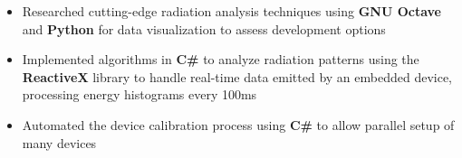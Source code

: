 \documentclass{moderncv}
\begin{document}
{\begin{itemize}
    \item Researched cutting-edge radiation analysis techniques using \textbf{GNU Octave} and \textbf{Python} for data visualization to assess development options
    \item Implemented algorithms in \textbf{C\#} to analyze radiation patterns using the \textbf{ReactiveX} library to handle real-time data emitted by an embedded device, processing energy histograms every 100ms
    \item Automated the device calibration process using \textbf{C\#} to allow parallel setup of many devices
\end{itemize}}

\begin{comment}
\cventry{Sep 2020 - Dec 2020}{Undergraduate Research Assistant}{University of Waterloo}{Waterloo ON}{}
{\begin{itemize}
    \item Implemented novel post-quantum cryptographic algorithms in \textbf{C}
    \item Designed and implemented cache-aware optimizations resulting in 60\% speed improvement
    \item Created custom boolean matrix library for use in cryptographic algorithms
\end{itemize}}
\end{comment}

\begin{comment}
    \cventry{May 2019 - Aug 2019}{Secure Software Developer}{ESCRYPT}{Waterloo ON}{}
{\begin{itemize}
    \item Implemented asynchronous process in \textbf{C++} for periodically provisioning \textbf{X.509} certificates on-vehicle, improving anonymity in the system by enabling certificate swapping
    \item Wrote ETSI-compliant tests using \textbf{GoogleTest} framework to prove functionality
\end{itemize}}
\end{comment}
\end{document}
